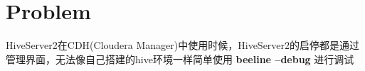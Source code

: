 \documentclass[11pt]{article}
\date{\today}
\title{}
\begin{document}
\tableofcontents

\section{Problem}
\label{sec:org242f232}
HiveServer2在CDH(Cloudera Manager)中使用时候，HiveServer2的启停都是通过管理界面，无法像自己搭建的hive环境一样简单使用  \textbf{beeline --debug} 进行调试
\end{document}
